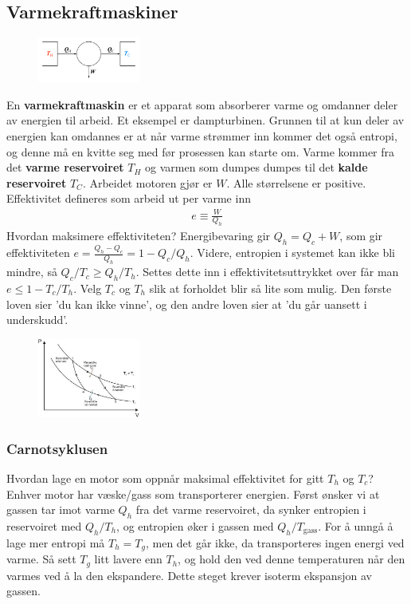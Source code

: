 \documentclass[12pt]{article}
\begin{document}
\subsection{Varmekraftmaskiner}
\begin{figure}
  \includegraphics[width=0.3\textwidth]{figures/carnot.png}
\end{figure}
En \textbf{varmekraftmaskin} er et apparat som absorberer varme og omdanner
deler av energien til arbeid. Et eksempel er dampturbinen. Grunnen til at kun
deler av energien kan omdannes er at når varme strømmer inn kommer det også
entropi, og denne må en kvitte seg med før prosessen kan starte om.
Varme kommer fra det \textbf{varme reservoiret} $T_H$ og varmen som dumpes dumpes til
det \textbf{kalde reservoiret} $T_C$. Arbeidet motoren gjør er $W$. Alle størrelsene er positive.
Effektivitet defineres som arbeid ut per varme inn
\begin{align*}
  e \equiv \frac{W}{Q_h}
\end{align*}
Hvordan maksimere effektiviteten? Energibevaring gir $Q_h = Q_c + W$, som gir
effektiviteten $e = \frac{Q_h - Q_c}{Q_h} = 1 - Q_c/Q_h$.
Videre, entropien i systemet kan ikke bli mindre, så $Q_c / T_c \geq Q_h / T_h$.
Settes dette inn i effektivitetsuttrykket over får man $e \leq 1 - T_c / T_h$.
Velg $T_c$ og $T_h$ slik at forholdet blir så lite som mulig. Den første loven
sier 'du kan ikke vinne', og den andre loven sier at 'du går uansett i underskudd'.
\begin{figure}
  \includegraphics[width=0.3\textwidth]{figures/carnotPV.jpg}
\end{figure}
\subsubsection{Carnotsyklusen}
Hvordan lage en motor som oppnår maksimal effektivitet for gitt $T_h$ og $T_c$?
Enhver motor har væske/gass som transporterer energien. Først ønsker vi at
gassen tar imot varme $Q_h$ fra det varme reservoiret, da synker entropien i
reservoiret med $Q_h/T_h$, og entropien øker i gassen med $Q_h / T_\text{gass}$.
For å unngå å lage mer entropi må $T_h = T_g$, men det går ikke, da transporteres
ingen energi ved varme. Så sett $T_g$ litt lavere enn $T_h$, og hold den ved
denne temperaturen når den varmes ved å la den ekspandere. Dette steget krever
isoterm ekspansjon av gassen.
\end{document}
